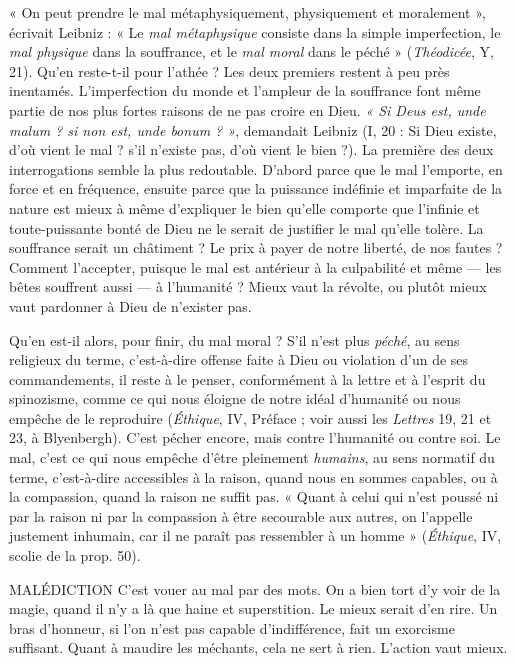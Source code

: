 « On peut prendre le mal métaphysiquement, physiquement et moralement »,
écrivait Leibniz : « Le {\it mal métaphysique} consiste dans la simple imperfection,
le {\it mal physique} dans la souffrance, et le {\it mal moral} dans le péché »
({\it Théodicée}, Y, 21). Qu'en reste-t-il pour l’athée ? Les deux premiers restent à
peu près inentamés. L’imperfection du monde et l’ampleur de la souffrance
font même partie de nos plus fortes raisons de ne pas croire en Dieu. {\it « Si
Deus est, unde malum ? si non est, unde bonum ? »}, demandait Leibniz (I, 20 :
Si Dieu existe, d’où vient le mal ? s’il n’existe pas, d’où vient le bien ?). La
première des deux interrogations semble la plus redoutable. D'abord parce
que le mal l'emporte, en force et en fréquence, ensuite parce que la puissance
indéfinie et imparfaite de la nature est mieux à même d’expliquer le bien
qu'elle comporte que l’infinie et toute-puissante bonté de Dieu ne le serait de
justifier le mal qu’elle tolère. La souffrance serait un châtiment ? Le prix à
payer de notre liberté, de nos fautes ? Comment l’accepter, puisque le mal est
antérieur à la culpabilité et même — les bêtes souffrent aussi — à l'humanité ?
Mieux vaut la révolte, ou plutôt mieux vaut pardonner à Dieu de n’exister
pas.

Qu'en est-il alors, pour finir, du mal moral ? S'il n’est plus {\it péché}, au sens
religieux du terme, c’est-à-dire offense faite à Dieu ou violation d’un de ses
commandements, il reste à le penser, conformément à la lettre et à l'esprit du
spinozisme, comme ce qui nous éloigne de notre idéal d'humanité ou nous
empêche de le reproduire ({\it Éthique}, IV, Préface ; voir aussi les {\it Lettres} 19, 21 et
23, à Blyenbergh). C’est pécher encore, mais contre l'humanité ou contre soi.
Le mal, c’est ce qui nous empêche d’être pleinement {\it humains}, au sens normatif
du terme, c’est-à-dire accessibles à la raison, quand nous en sommes capables,
ou à la compassion, quand la raison ne suffit pas. « Quant à celui qui n’est
poussé ni par la raison ni par la compassion à être secourable aux autres, on
l'appelle justement inhumain, car il ne paraît pas ressembler à un homme »
({\it Éthique}, IV, scolie de la prop. 50).

MALÉDICTION C’est vouer au mal par des mots. On a bien tort d’y voir
de la magie, quand il n’y a là que haine et superstition. Le
mieux serait d’en rire. Un bras d'honneur, si l’on n’est pas capable d’indifférence,
fait un exorcisme suffisant.
Quant à maudire les méchants, cela ne sert à rien. L'action vaut mieux.

